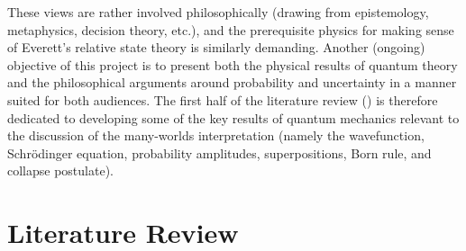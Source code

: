 \documentclass{article}
\begin{document}
These views are rather involved philosophically (drawing from epistemology, metaphysics, decision theory, etc.), and the prerequisite physics for making sense of Everett's relative state theory is similarly demanding. Another (ongoing) objective of this project is to present both the physical results of quantum theory and the philosophical arguments around probability and uncertainty in a manner suited for both audiences. The first half of the literature review () is therefore dedicated to developing some of the key results of quantum mechanics relevant to the discussion of the many-worlds interpretation (namely the wavefunction, Schrödinger equation, probability amplitudes, superpositions, Born rule, and collapse postulate). 





\newpage

\section{Literature Review}
\end{document}
